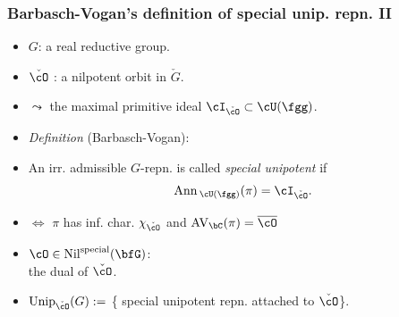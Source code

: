 \documentclass[t,11pt,usenames,dvipsnames]{beamer}
\theoremstyle{plain}
\theoremstyle{definition}
\newcommand{\AV}{\mathrm{AV}}
\def\Ann{{\mathrm{Ann}\,}}
\def\Unip{{\mathrm{Unip}}}
\def\ckcO{{\check{\cO}}}
\def\Nil{\mathrm{Nil}}
\def\blue{\color{blue}}
\let\oldemph\emph
\def\emph#1{\oldemph{\blue #1}}
\begin{document}
    \begin{frame}
      \frametitle{Barbasch-Vogan's definition of  special unip. repn. II}
      \begin{itemize}[<+->]
            \item[] $G$: a real reductive group.
            \item  $\ckcO$ : a nilpotent orbit in $\check G$.
            \item[] \hspace{1em} $\leadsto$  the maximal primitive ideal
            $\cI_\ckcO\subset \cU(\fgg)$. %
            \item  \emph{Definition} (Barbasch-Vogan):
            \item [] An irr. admissible $G$-repn. is called
            \emph{special unipotent} if
            \[
            \Ann_{\cU(\fgg)}(\pi) = \cI_{\ckcO}.
            \]
            \item[]
            $\Longleftrightarrow$ $\pi$ has inf. char. $\chi_{\ckcO}$ and
            $\AV_\bC(\pi) = \overline{\cO}$
            \item $\cO\in \Nil^{\text{special}}(\bfG)$:\\
            the 
            dual of $\ckcO$.
            \item $\Unip_{\ckcO}(G):=$ \{ special unipotent repn. attached to $\ckcO$\}.
      \end{itemize}
    \end{frame}
\end{document}
